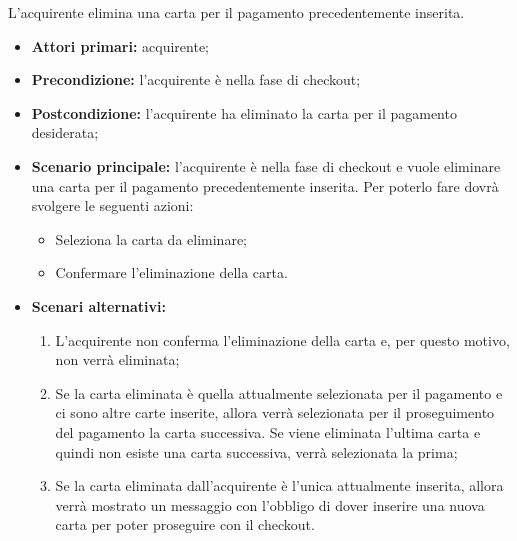 
L'acquirente elimina una carta per il pagamento precedentemente inserita.
\begin{itemize}
    \item \textbf{Attori primari:} acquirente;
    \item \textbf{Precondizione:} l'acquirente è nella fase di checkout;
    \item \textbf{Postcondizione:} l'acquirente ha eliminato la carta per il pagamento desiderata;
    \item \textbf{Scenario principale:} l'acquirente è nella fase di checkout e vuole eliminare una carta per il pagamento precedentemente inserita. Per poterlo fare dovrà svolgere le seguenti azioni:
        \begin{itemize}
            \item Seleziona la carta da eliminare;
            \item Confermare l'eliminazione della carta.
        \end{itemize}
    \item \textbf{Scenari alternativi:}
    \begin{enumerate}[label=\lett]
        \item L'acquirente non conferma l'eliminazione della carta e, per questo motivo, non verrà eliminata;
        \item Se la carta eliminata è quella attualmente selezionata per il pagamento e ci sono altre carte inserite, allora verrà selezionata per il proseguimento del pagamento la carta successiva. Se viene eliminata l'ultima carta e quindi non esiste una carta successiva, verrà selezionata la prima;
        \item Se la carta eliminata dall'acquirente è l'unica attualmente inserita, allora verrà mostrato un messaggio con l'obbligo di dover inserire una nuova carta per poter proseguire con il checkout.
    \end{enumerate}
\end{itemize}

